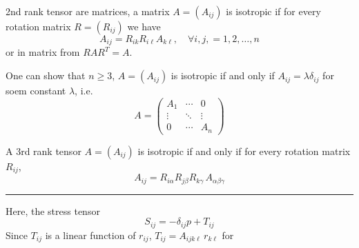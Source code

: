 
2nd rank tensor are matrices, a matrix $A = (A_{ij})$ is isotropic if for every rotation matrix $R = (R_{ij})$ we have
\begin{equation}
A_{ij} = R_{ik}R_{i\ell}A_{k\ell},\quad \forall i,j,=1,2,\ldots,n
\end{equation}
or in matrix from $RAR^{T} = A$. 

One can show that $n\geq 3$, $A=(A_{ij})$ is isotropic if and only if $A_{ij} = \lambda \delta_{ij}$  for soem constant $\lambda$, i.e.
\begin{equation}
A = \begin{pmatrix}
A_{1} & \cdots & 0\\
\vdots & \ddots & \vdots\\
0 & \cdots & A_{n}
\end{pmatrix}
\end{equation}



A 3rd rank tensor $A = (A_{ij})$ is isotropic if and only if for every rotation matrix $R_{ij}$, 
\begin{equation}
A_{ij} = R_{i\alpha}R_{j\beta}R_{k\gamma}\,A_{\alpha\beta\gamma}
\end{equation}

\vspace{5pt}
\hrule
\vspace{6pt}

Here, the stress tensor 
\begin{equation}
S_{ij} = -\delta_{ij}p + T_{ij}
\end{equation}
Since $T_{ij}$ is a linear function of $r_{ij}$, $T_{ij} = A_{ijk\ell}\,r_{k\ell}$ for 

